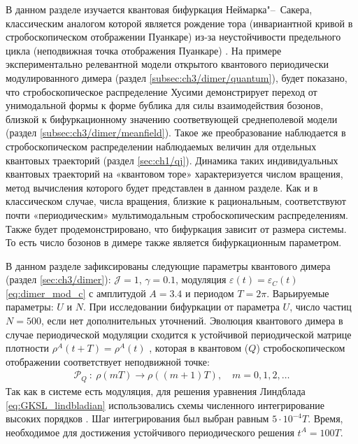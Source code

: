 В данном разделе изучается квантовая бифуркация Неймарка"--~Сакера, классическим аналогом которой является рождение тора (инвариантной кривой в стробоскопическом отображении Пуанкаре) из-за неустойчивости предельного цикла (неподвижная точка отображения Пуанкаре) \cite{Kuznetsov2004}.
На примере экспериментально релевантной модели открытого квантового периодически модулированного димера (раздел \cref{subsec:ch3/dimer/quantum}), будет показано, что стробоскопическое распределение Хусими \cite{Stockmann2006} демонстрирует переход от унимодальной формы к форме бублика для силы взаимодействия бозонов, близкой к бифуркационному значению соответвующей среднеполевой модели (раздел \cref{subsec:ch3/dimer/meanfield}). 
Такое же преобразование наблюдается в стробоскопическом распределении наблюдаемых величин для отдельных квантовых траекторий (раздел \cref{sec:ch1/qj}). 
Динамика таких индивидуальных квантовых траекторий на «квантовом торе» характеризуется числом вращения, метод вычисления которого будет представлен в данном разделе. 
Как и в классическом случае, числа вращения, близкие к рациональным, соответствуют почти «периодическим» мультимодальным стробоскопическим распределениям. 
Также будет продемонстрировано, что бифуркация зависит от размера системы. То есть число бозонов в димере также является бифуркационным параметром.

В данном разделе зафиксированы следующие параметры квантового димера (раздел \cref{sec:ch3/dimer}): \(\mathcal{J}=1\), \(\gamma=0.1\), модуляция \(\varepsilon(t)=\varepsilon_{C}(t)\) \cref{eq:dimer_mod_c} с амплитудой \(A=3.4\) и периодом \(T=2\pi\).
Варьируемые параметры: \(U\) и \(N\).
При исследовании бифуркации от параметра \(U\), число частиц \(N=500\), если нет дополнительных уточнений.
Эволюция квантового димера в случае периодической модуляции сходится к устойчивой периодической матрице плотности \(\rho^A(t + T) = \rho^A(t)\) \cite{Meyer1977}, которая в квантовом (\(Q\)) стробоскопическом отображении соответствует неподвижной точке:
\begin{equation}
	\label{eq:dimer_stroboscopic_q}
	\begin{gathered}
		\mathcal{P}_Q~:~\rho(mT) \to \rho((m+1)T), \quad m=0, 1, 2, \ldots
	\end{gathered}
\end{equation}
Так как в системе есть модуляция, для решения уравнения Линдблада \cref{eq:GKSL_lindbladian}
использовались схемы численного интегрирование высоких порядков \cite{Lambert1991}.
Шаг интегрирования был выбран равным $5\cdot10^{-4}T$.
Время, необходимое для достижения устойчивого периодического решения \(t^A = 100T\).

